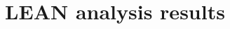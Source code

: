 \documentclass{article}
\begin{document}
\title{LEAN analysis results}
\maketitle
\newpage


\end{document}
